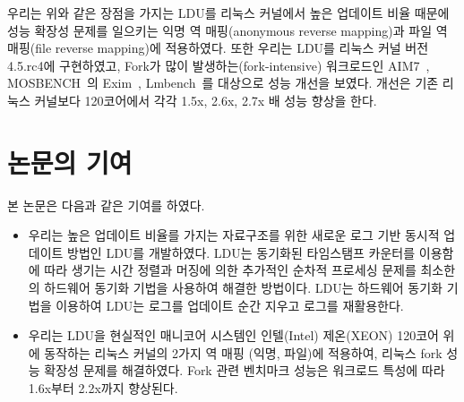 우리는 위와 같은 장점을 가지는 LDU를 리눅스 커널에서 높은 업데이트 비율 때문에 성능 확장성 
문제를 일으키는 익명 역 매핑(anonymous reverse mapping)과 파일 역 매핑(file reverse mapping)에
적용하였다.
또한 우리는 LDU를 리눅스 커널 버전 4.5.rc4에 구현하였고, Fork가 많이 발생하는(fork-intensive) 워크로드인
AIM7~\cite{AIM7Benchmark}, MOSBENCH~\cite{MOSBENCH}의 Exim~\cite{Exim},
Lmbench~\cite{mcvoy1996lmbench}를 대상으로 성능 개선을 보였다.
개선은 기존 리눅스 커널보다 120코어에서 각각 1.5x, 2.6x, 2.7x 배 성능 향상을 한다.

\newpage
\section{논문의 기여}\label{sec:introcontri}
본 논문은 다음과 같은 기여를 하였다.
\begin{itemize}
\item 우리는 높은 업데이트 비율를 가지는 자료구조를 위한 새로운 로그 기반 동시적 업데이트
 방법인 LDU를 개발하였다.
LDU는 동기화된 타임스탬프 카운터를 이용함에 따라 생기는 시간 정렬과 머징에 의한 추가적인
순차적 프로세싱 문제를 최소한의 하드웨어 동기화 기법을 사용하여 해결한 방법이다.
LDU는 하드웨어 동기화 기법을 이용하여 LDU는 로그를 업데이트 순간 지우고 로그를
재활용한다.
\item 
우리는 LDU을 현실적인 매니코어 시스템인 인텔(Intel) 제온(XEON)
 120코어 위에 동작하는 리눅스 커널의 2가지 역 매핑 (익명, 파일)에 적용하여, 리눅스 fork
 성능 확장성 문제를 해결하였다.
Fork 관련 벤치마크 성능은 워크로드 특성에 따라 1.6x부터 2.2x까지 향상된다.
\end{itemize}


